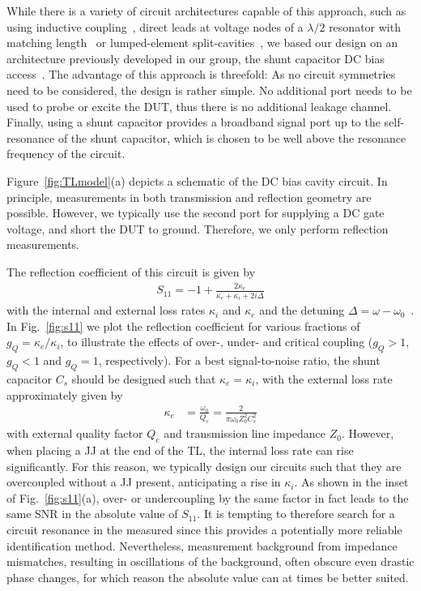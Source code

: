 While there is a variety of circuit architectures capable of this approach, such as using inductive coupling~\cite{vissersFrequencytunableSuperconductingResonators2015b}, direct leads at voltage nodes of a $\lambda/2$ resonator with matching length~\cite{chenIntroductionDcBias2011a,liApplyingDirectCurrent2013} or lumped-element split-cavities~\cite{mahashabdeFastTunableHigh2020}, we based our design on an architecture previously developed in our group, the shunt capacitor DC bias access~\cite{bosmanBroadbandArchitectureGalvanically2015c}.
%
The advantage of this approach is threefold:
%
As no circuit symmetries need to be considered, the design is rather simple.
%
No additional port needs to be used to probe or excite the DUT, thus there is no additional leakage channel.
%
Finally, using a shunt capacitor provides a broadband signal port up to the self-resonance of the shunt capacitor, which is chosen to be well above the resonance frequency of the circuit.

Figure~\ref{fig:TLmodel}(a) depicts a schematic of the DC bias cavity circuit.
%
In principle, measurements in both transmission and reflection geometry are possible.
%
However, we typically use the second port for supplying a DC gate voltage, and short the DUT to ground.
%
Therefore, we only perform reflection measurements.

The reflection coefficient of this circuit is given by
%
\begin{align}
S_{11}=-1+\frac{2\kappa_e}{\kappa_e+\kappa_i+2i\Delta}
\label{eq:intro-s11}
\end{align}
%
with the internal and external loss rates $\kappa_i$ and $\kappa_e$ and the detuning $\Delta=\omega-\omega_0$~\cite{bosmanBroadbandArchitectureGalvanically2015c}.
%
In Fig.~\ref{fig:s11} we plot the reflection coefficient for various fractions of $g_Q =\kappa_e/\kappa_i$, to illustrate the effects of over-, under- and critical coupling ($g_Q >1$, $g_Q <1$ and $g_Q =1$, respectively).
%
For a best signal-to-noise ratio, the shunt capacitor $C_s$ should be designed such that $\kappa_e=\kappa_i$, with the external loss rate approximately given by
%
\begin{align}
\kappa_e &= \frac{\omega_0}{Q_e} = \frac{2}{\pi\omega_0Z_0^2C_s^2}
\label{eq:intro-kappae}
\end{align}
%
with external quality factor $Q_e$ and transmission line impedance $Z_0$.
%
However, when placing a JJ at the end of the TL, the internal loss rate can rise significantly.
%
For this reason, we typically design our circuits such that they are overcoupled without a JJ present, anticipating a rise in $\kappa_i$.
%
As shown in the inset of Fig.~\ref{fig:s11}(a), over- or undercoupling by the same factor in fact leads to the same SNR in the absolute value of $S_{11}$.
%
It is tempting to therefore search for a circuit resonance in the measured since this provides a potentially more reliable identification method.
%
Nevertheless, measurement background from impedance mismatches, resulting in oscillations of the background, often obscure even drastic phase changes, for which reason the absolute value can at times be better suited.

